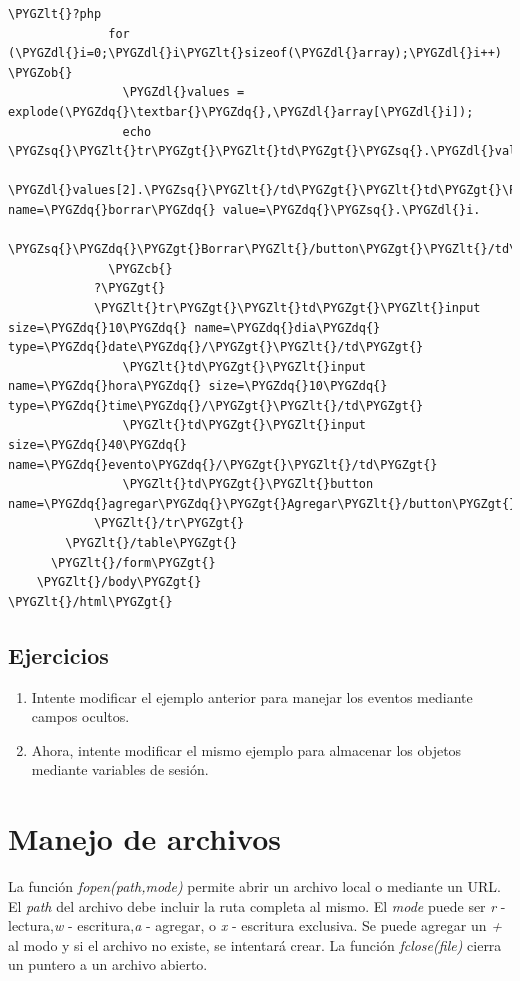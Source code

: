 \documentclass[a5paper,10pt,spanish]{sphinxmanual}
\def\PYGZob{\char`\{}
\def\PYGZcb{\char`\}}
\def\PYGZlt{\char`\<}
\def\PYGZgt{\char`\>}
\def\PYGZdl{\char`\$}
\def\PYGZsq{\char`\'}
\def\PYGZdq{\char`\"}
\begin{document}
\begin{Verbatim}[commandchars=\\\{\}]
            \PYGZlt{}?php
              for (\PYGZdl{}i=0;\PYGZdl{}i\PYGZlt{}sizeof(\PYGZdl{}array);\PYGZdl{}i++) \PYGZob{}
                \PYGZdl{}values = explode(\PYGZdq{}\textbar{}\PYGZdq{},\PYGZdl{}array[\PYGZdl{}i]);
                echo \PYGZsq{}\PYGZlt{}tr\PYGZgt{}\PYGZlt{}td\PYGZgt{}\PYGZsq{}.\PYGZdl{}values[0].\PYGZsq{}\PYGZlt{}/td\PYGZgt{}\PYGZlt{}td\PYGZgt{}\PYGZsq{}.\PYGZdl{}values[1].\PYGZsq{}\PYGZlt{}/td\PYGZgt{}\PYGZlt{}td\PYGZgt{}\PYGZsq{}.
                    \PYGZdl{}values[2].\PYGZsq{}\PYGZlt{}/td\PYGZgt{}\PYGZlt{}td\PYGZgt{}\PYGZlt{}button name=\PYGZdq{}borrar\PYGZdq{} value=\PYGZdq{}\PYGZsq{}.\PYGZdl{}i.
                    \PYGZsq{}\PYGZdq{}\PYGZgt{}Borrar\PYGZlt{}/button\PYGZgt{}\PYGZlt{}/td\PYGZgt{}\PYGZlt{}/tr\PYGZgt{}\PYGZsq{};
              \PYGZcb{}
            ?\PYGZgt{}
            \PYGZlt{}tr\PYGZgt{}\PYGZlt{}td\PYGZgt{}\PYGZlt{}input size=\PYGZdq{}10\PYGZdq{} name=\PYGZdq{}dia\PYGZdq{} type=\PYGZdq{}date\PYGZdq{}/\PYGZgt{}\PYGZlt{}/td\PYGZgt{}
                \PYGZlt{}td\PYGZgt{}\PYGZlt{}input name=\PYGZdq{}hora\PYGZdq{} size=\PYGZdq{}10\PYGZdq{} type=\PYGZdq{}time\PYGZdq{}/\PYGZgt{}\PYGZlt{}/td\PYGZgt{}
                \PYGZlt{}td\PYGZgt{}\PYGZlt{}input size=\PYGZdq{}40\PYGZdq{} name=\PYGZdq{}evento\PYGZdq{}/\PYGZgt{}\PYGZlt{}/td\PYGZgt{}
                \PYGZlt{}td\PYGZgt{}\PYGZlt{}button name=\PYGZdq{}agregar\PYGZdq{}\PYGZgt{}Agregar\PYGZlt{}/button\PYGZgt{}\PYGZlt{}/td\PYGZgt{}
            \PYGZlt{}/tr\PYGZgt{}
        \PYGZlt{}/table\PYGZgt{}
      \PYGZlt{}/form\PYGZgt{}
    \PYGZlt{}/body\PYGZgt{}
\PYGZlt{}/html\PYGZgt{}
\end{Verbatim}


\subsection{Ejercicios}
\label{Tutorial3_Sesiones.md:ejercicios}\begin{enumerate}
\item {} 
Intente modificar el ejemplo anterior para manejar los eventos
mediante campos ocultos.

\item {} 
Ahora, intente modificar el mismo ejemplo para almacenar los objetos
mediante variables de sesión.

\end{enumerate}


\section{Manejo de archivos}
\label{Tutorial4_Archivos.md:manejo-de-archivos}\label{Tutorial4_Archivos.md::doc}
La función \emph{fopen(path,mode)} permite abrir un archivo local o mediante
un URL. El \emph{path} del archivo debe incluir la ruta completa al mismo. El
\emph{mode} puede ser \emph{r} - lectura,\emph{w} - escritura,\emph{a} - agregar, o \emph{x}
- escritura exclusiva. Se puede agregar un \emph{+} al modo y si el archivo
no existe, se intentará crear. La función \emph{fclose(file)} cierra un
puntero a un archivo abierto.
\end{document}
